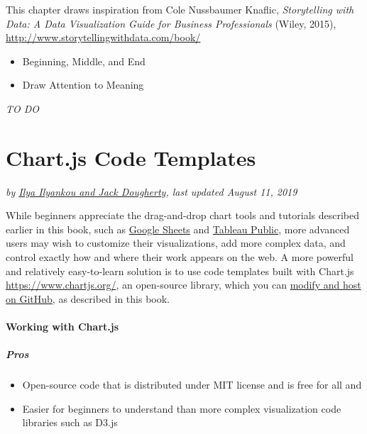 \documentclass[
  english,
]{book}
\providecommand{\tightlist}{%
  \setlength{\itemsep}{0pt}\setlength{\parskip}{0pt}}
\begin{document}
This chapter draws inspiration from Cole Nussbaumer Knaflic, \emph{Storytelling with Data: A Data Visualization Guide for Business Professionals} (Wiley, 2015), \url{http://www.storytellingwithdata.com/book/}

\begin{itemize}
\tightlist
\item
  Beginning, Middle, and End
\item
  Draw Attention to Meaning
\end{itemize}

\emph{TO DO}

\hypertarget{chartjs}{%
\chapter{Chart.js Code Templates}\label{chartjs}}

\emph{by \href{authors}{Ilya Ilyankou and Jack Dougherty}, last updated August 11, 2019}

While beginners appreciate the drag-and-drop chart tools and tutorials described earlier in this book, such as \href{google-sheets}{Google Sheets} and \href{tableau-public}{Tableau Public}, more advanced users may wish to customize their visualizations, add more complex data, and control exactly how and where their work appears on the web. A more powerful and relatively easy-to-learn solution is to use code templates built with Chart.js \url{https://www.chartjs.org/}, an open-source library, which you can \href{github}{modify and host on GitHub}, as described in this book.

\hypertarget{working-with-chart.js}{%
\subsubsection{Working with Chart.js}\label{working-with-chart.js}}

\hypertarget{pros}{%
\paragraph{Pros}\label{pros}}

\begin{itemize}
\tightlist
\item
  Open-source code that is distributed under MIT license and is free for all and
\item
  Easier for beginners to understand than more complex visualization code libraries such as D3.js
\end{itemize}
\end{document}
